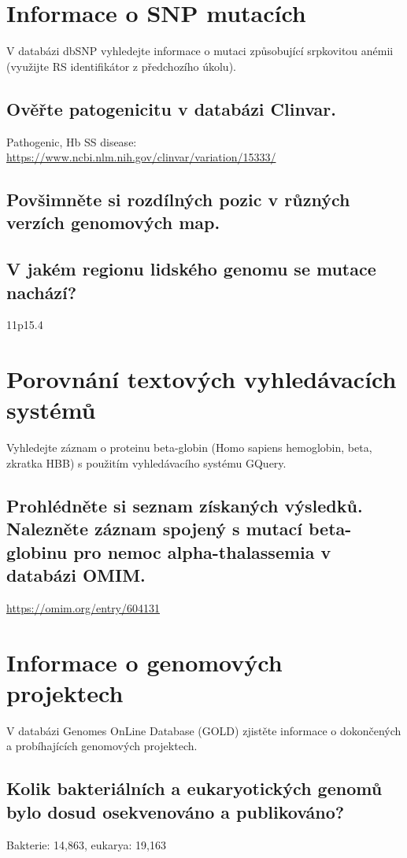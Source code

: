 \documentclass[11pt]{article}
\begin{document}
\section{Informace o SNP mutacích}
\label{sec:orga4c37fa}
V databázi dbSNP vyhledejte informace o mutaci způsobující srpkovitou anémii (využijte RS identifikátor z předchozího úkolu).

\subsection{Ověřte patogenicitu v databázi Clinvar.}
\label{sec:org259b3f1}
Pathogenic, Hb SS disease: \url{https://www.ncbi.nlm.nih.gov/clinvar/variation/15333/}
\subsection{Povšimněte si rozdílných pozic v různých verzích genomových map.}
\label{sec:org0368791}
\subsection{V jakém regionu lidského genomu se mutace nachází?}
\label{sec:orgb5edc9e}
11p15.4

\section{Porovnání textových vyhledávacích systémů}
\label{sec:org8e290e9}
Vyhledejte záznam o proteinu beta-globin (Homo sapiens hemoglobin, beta, zkratka HBB) s použitím vyhledávacího systému GQuery.

\subsection{Prohlédněte si seznam získaných výsledků. Nalezněte záznam spojený s mutací beta-globinu pro nemoc alpha-thalassemia v databázi OMIM.}
\label{sec:orgb9dc3af}
\url{https://omim.org/entry/604131}

\section{Informace o genomových projektech}
\label{sec:orgc586a71}
V databázi Genomes OnLine Database (GOLD) zjistěte informace o dokončených a probíhajících genomových projektech.

\subsection{Kolik bakteriálních a eukaryotických genomů bylo dosud osekvenováno a publikováno?}
\label{sec:org5f361ab}
Bakterie: 14,863, eukarya: 19,163
\end{document}
